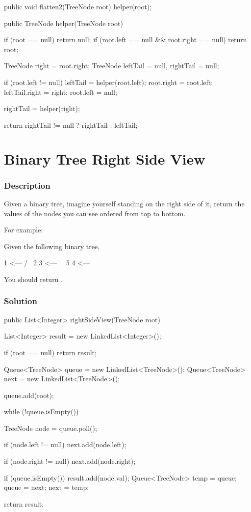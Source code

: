 \begin{Code}
public void flatten2(TreeNode root) {
    helper(root);
}

public TreeNode helper(TreeNode root) {
    if (root == null) {
        return null;
    }
    if (root.left == null && root.right == null) {
        return root;
    }

    TreeNode right = root.right;
    TreeNode leftTail = null, rightTail = null;

    if (root.left != null) {
        leftTail = helper(root.left);
        root.right = root.left;
        leftTail.right = right;
        root.left = null;
    }

    rightTail = helper(right);

    return rightTail != null ? rightTail : leftTail;
}
\end{Code}

\newpage

\section{Binary Tree Right Side View} %

\subsubsection{Description}
Given a binary tree, imagine yourself standing on the right side of it, return the values of the nodes you can see ordered from top to bottom.

For example:

Given the following binary tree,
\begin{Code}
   1            <---
 /   \
2     3         <---
 \     \
  5     4       <---
\end{Code}

You should return \code{[1, 3, 4]}.

\subsubsection{Solution}

\begin{Code}
public List<Integer> rightSideView(TreeNode root) {
    List<Integer> result = new LinkedList<Integer>();

    if (root == null) {
        return result;
    }

    Queue<TreeNode> queue = new LinkedList<TreeNode>();
    Queue<TreeNode> next = new LinkedList<TreeNode>();

    queue.add(root);

    while (!queue.isEmpty()) {
        TreeNode node = queue.poll();

        if (node.left != null) {
            next.add(node.left);
        }

        if (node.right != null) {
            next.add(node.right);
        }

        if (queue.isEmpty()) {
            result.add(node.val);
            Queue<TreeNode> temp = queue;
            queue = next;
            next = temp;
        }
    }

    return result;
}
\end{Code}

